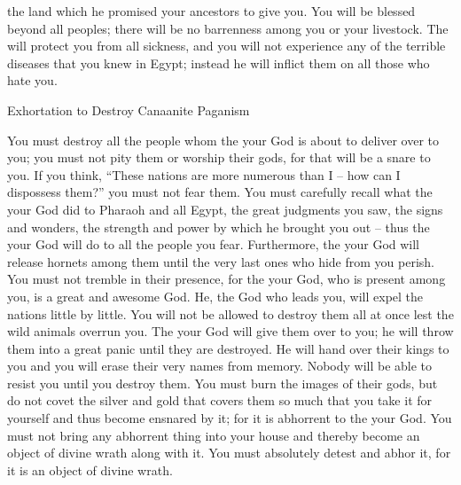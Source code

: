 {the land
which
he promised
your ancestors
to give you.
You will be blessed
beyond
all
peoples;
there will be
no
barrenness
among you or your livestock.
The
{}
will protect
you from
all
sickness,
and you will not experience any
of the terrible
diseases
that
you knew
in Egypt;
instead he will inflict
them
on
all
those who hate you.
\par }{\SH Exhortation to Destroy Canaanite Paganism
\par }{\PP {}You must destroy
all
the people
whom the
{}
your God
is about to deliver
over to you; you must not
pity
them or
worship
their gods,
for
that will be a snare to you.
If
you think,
“These
nations
are more numerous
than I – how can I dispossess them?”
you must not
fear
them.
You must
carefully recall
what
the {}
your God
did
to Pharaoh
and all
Egypt,
the great
judgments
you saw,
the signs
and wonders,
the strength
and power
by which
he brought you out
– thus
the {}
your God
will do
to all
the people
you
fear.
Furthermore,
the {}
your God
will release
hornets
among them until
the very last ones who hide
from you perish.
You must not
tremble
in their presence,
for
the {}
your God,
who is present among
you, is a great
and awesome
God.
He, the God
who leads you, will expel
the
nations
little
by little.
You will not
be allowed
to destroy
them all at once
lest
the wild
animals
overrun you.
The
{}
your God
will give
them over
to you; he will throw
them into a great
panic
until
they are destroyed.
He will hand
over
their kings
to you and you will erase
their very names
from
memory.
Nobody
will be able to resist
you until
you destroy them.
You must burn
the images
of their gods,
but do not
covet
the silver
and gold
that covers them
so
much that you take
it for yourself and thus become ensnared
by it; for
it is abhorrent
to the
{}
your God.
You must not
bring
any abhorrent
thing into
your house
and thereby become an object
of divine
wrath along with it. You must absolutely detest
and abhor
it, for
it is an object of divine wrath.

}
